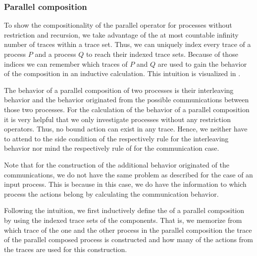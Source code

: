 \subsubsection{Parallel composition}
\label{sec_comp_par}
To show the compositionality of the parallel operator for processes without restriction and recursion, we take advantage of the at most countable infinity number of traces within a trace set. Thus, we can uniquely index every trace of a process $P$ and a process $Q$ to reach their indexed trace sets. Because of those indices we can remember which traces of $P$ and $Q$ are used to gain the behavior of the composition in an inductive calculation. This intuition is visualized in .



The behavior of a parallel composition of two processes is their interleaving behavior and the behavior originated from the possible communications between those two processes. For the calculation of the behavior of a parallel composition it is very helpful that we only investigate processes without any restriction operators. Thus, no bound action can exist in any trace. Hence, we neither have to attend to the side condition of the \eparl{} respectively \eparr{} rule for the interleaving behavior nor mind the \eclosel{} respectively \ecloser{} rule of  for the communication case.

Note that for the construction of the additional behavior originated of the communications, we do not have the same problem as described for the case of an input process. This is because in this case, we do have the information to which process the actions belong by calculating the communication behavior.

Following the intuition, we first inductively define the  of a parallel composition by using the indexed trace sets of the components. That is, we memorize from which trace of the one and the other process in the parallel composition the trace of the parallel composed process is constructed and how many of the actions from the traces are used for this construction.

